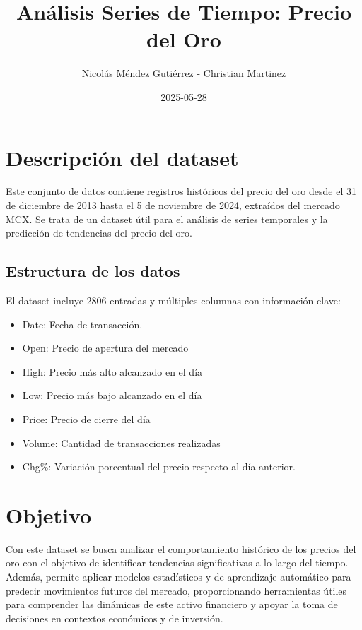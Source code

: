 \documentclass[
]{book}
\title{Análisis Series de Tiempo: Precio del Oro}
\author{Nicolás Méndez Gutiérrez - Christian Martinez}
\date{2025-05-28}
\providecommand{\tightlist}{%
  \setlength{\itemsep}{0pt}\setlength{\parskip}{0pt}}
\begin{document}
\maketitle

{
\setcounter{tocdepth}{1}
\tableofcontents
}
\chapter{Descripción del dataset}\label{descripciuxf3n-del-dataset}

Este conjunto de datos contiene registros históricos del precio del oro desde el 31 de diciembre de 2013 hasta el 5 de noviembre de 2024, extraídos del mercado MCX. Se trata de un dataset útil para el análisis de series temporales y la predicción de tendencias del precio del oro.

\section{Estructura de los datos}\label{estructura-de-los-datos}

El dataset incluye 2806 entradas y múltiples columnas con información clave:

\begin{itemize}
\tightlist
\item
  Date: Fecha de transacción.
\item
  Open: Precio de apertura del mercado
\item
  High: Precio más alto alcanzado en el día
\item
  Low: Precio más bajo alcanzado en el día
\item
  Price: Precio de cierre del día
\item
  Volume: Cantidad de transacciones realizadas
\item
  Chg\%: Variación porcentual del precio respecto al día anterior.
\end{itemize}

\chapter{Objetivo}\label{objetivo}

Con este dataset se busca analizar el comportamiento histórico de los precios del oro con el objetivo de identificar tendencias significativas a lo largo del tiempo. Además, permite aplicar modelos estadísticos y de aprendizaje automático para predecir movimientos futuros del mercado, proporcionando herramientas útiles para comprender las dinámicas de este activo financiero y apoyar la toma de decisiones en contextos económicos y de inversión.
\end{document}
